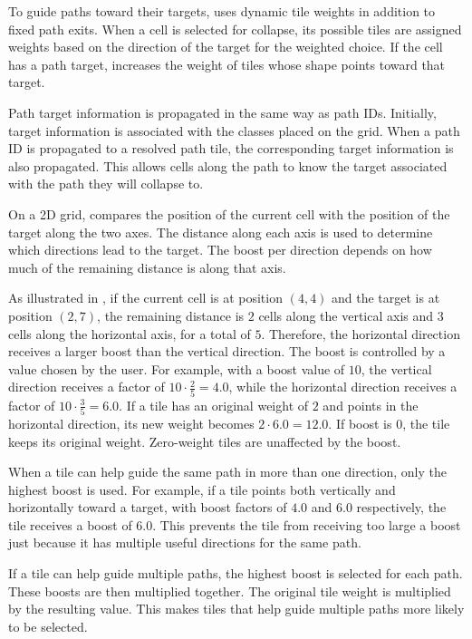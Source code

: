 \documentclass[../../main.tex]{subfiles}
\begin{document}
To guide paths toward their targets, \wassis uses dynamic tile weights in addition to fixed path exits. When a cell is selected for collapse, its possible tiles are assigned weights based on the direction of the target for the weighted choice. If the cell has a path target, \wassis increases the weight of tiles whose shape points toward that target.

Path target information is propagated in the same way as path IDs. Initially, target information is associated with the classes placed on the grid. When a path ID is propagated to a resolved path tile, the corresponding target information is also propagated. This allows cells along the path to know the target associated with the path they will collapse to.

On a 2D grid, \wassis compares the position of the current cell with the position of the target along the two axes. The distance along each axis is used to determine which directions lead to the target. The boost per direction depends on how much of the remaining distance is along that axis.

As illustrated in , if the current cell is at position $(4,4)$ and the target is at position $(2,7)$, the remaining distance is $2$ cells along the vertical axis and $3$ cells along the horizontal axis, for a total of $5$. Therefore, the horizontal direction receives a larger boost than the vertical direction. The boost is controlled by a value chosen by the user. For example, with a boost value of $10$, the vertical direction receives a factor of $10 \cdot \frac{2}{5} = 4.0$, while the horizontal direction receives a factor of $10 \cdot \frac{3}{5} = 6.0$. If a tile has an original weight of $2$ and points in the horizontal direction, its new weight becomes $2 \cdot 6.0 = 12.0$. If boost is $0$, the tile keeps its original weight. Zero-weight tiles are unaffected by the boost.

When a tile can help guide the same path in more than one direction, only the highest boost is used. For example, if a tile points both vertically and horizontally toward a target, with boost factors of $4.0$ and $6.0$ respectively, the tile receives a boost of $6.0$. This prevents the tile from receiving too large a boost just because it has multiple useful directions for the same path.

If a tile can help guide multiple paths, the highest boost is selected for each path. These boosts are then multiplied together. The original tile weight is multiplied by the resulting value. This makes tiles that help guide multiple paths more likely to be selected.
\end{document}
